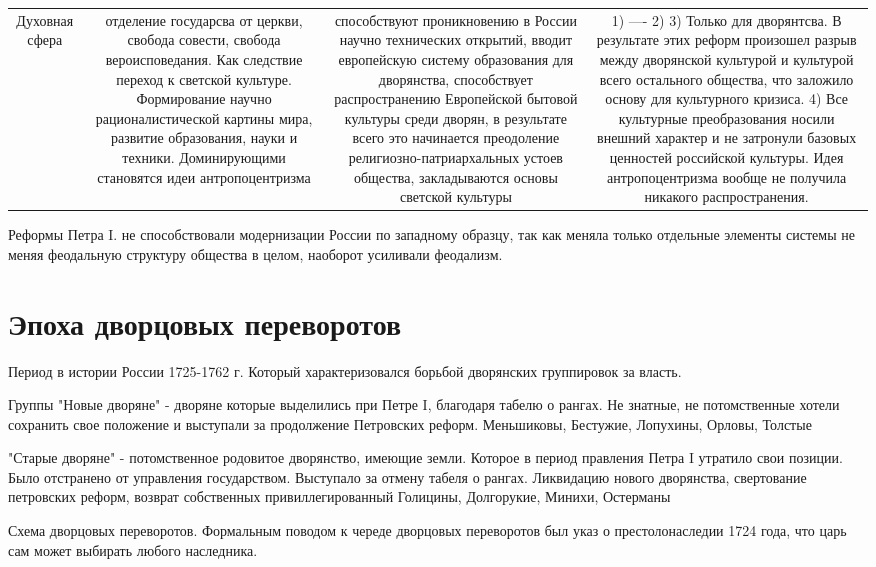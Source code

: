 \documentclass[a4paper]{article}
\begin{document}
\begin{center}
\begin{tabulary}{0.7\textwidth}{|c|c|c|c|}
Духовная сфера & отделение государсва от церкви, свобода совести, свобода вероисповедания. Как следствие переход к светской культуре. Формирование научно рационалистической картины мира, развитие образования, 
науки и техники. Доминирующими становятся идеи антропоцентризма & способствуют проникновению в России научно технических открытий, вводит европейскую систему образования для дворянства, способствует распространению Европейской бытовой культуры среди дворян, в результате всего это начинается преодоление религиозно-патриархальных устоев общества, закладываются основы светской культуры & 1) ----
2) 3) Только для дворянтсва. В результате этих реформ произошел разрыв между дворянской культурой и культурой всего остального общества, что заложило основу для культурного кризиса. 4) Все культурные преобразования носили внешний характер и не затронули базовых ценностей российской культуры. Идея антропоцентризма вообще не получила никакого распространения.
\hline
\end{tabulary}
\end{center}

Реформы Петра I. не способствовали модернизации России по западному образцу, так как меняла только отдельные элементы системы не меняя феодальную структуру общества в целом, наоборот усиливали феодализм.

\section{Эпоха дворцовых переворотов}
Период в истории России 1725-1762 г. Который характеризовался борьбой дворянских группировок за власть.

Группы
    "Новые дворяне" - дворяне которые выделились при Петре I, благодаря табелю о рангах. Не знатные, не потомственные хотели сохранить свое положение и выступали за продолжение Петровских реформ. 
    Меньшиковы, Бестужие, Лопухины, Орловы, Толстые

    "Старые дворяне" - потомственное родовитое дворянство, имеющие земли. Которое в период правления Петра I утратило свои позиции. Было отстранено от управления государством. Выступало за отмену табеля о рангах. Ликвидацию нового дворянства, свертование петровских реформ, возврат собственных привиллегированный
    Голицины, Долгорукие, Минихи, Остерманы

Схема дворцовых переворотов.
Формальным поводом к череде дворцовых переворотов был указ о престолонаследии 1724 года, что царь сам может выбирать любого наследника. 
\end{document}
